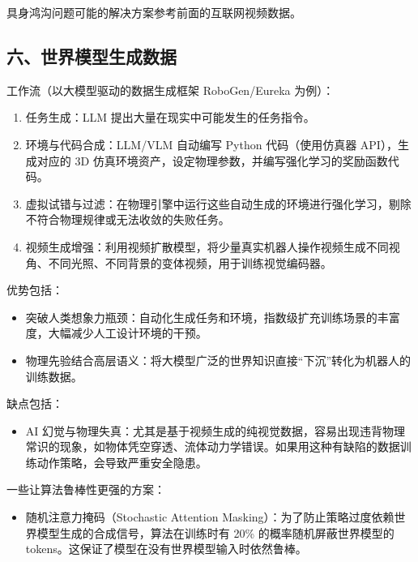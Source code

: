 具身鸿沟问题可能的解决方案参考前面的互联网视频数据。

\hypertarget{ux516dux4e16ux754cux6a21ux578bux751fux6210ux6570ux636e}{%
\subsection{六、世界模型生成数据}\label{ux516dux4e16ux754cux6a21ux578bux751fux6210ux6570ux636e}}

工作流（以大模型驱动的数据生成框架 RoboGen/Eureka 为例）：

\begin{enumerate}
\def\labelenumi{\arabic{enumi}.}
\tightlist
\item
  任务生成：LLM 提出大量在现实中可能发生的任务指令。
\item
  环境与代码合成：LLM/VLM 自动编写 Python 代码（使用仿真器 API），生成对应的 3D 仿真环境资产，设定物理参数，并编写强化学习的奖励函数代码。
\item
  虚拟试错与过滤：在物理引擎中运行这些自动生成的环境进行强化学习，剔除不符合物理规律或无法收敛的失败任务。
\item
  视频生成增强：利用视频扩散模型，将少量真实机器人操作视频生成不同视角、不同光照、不同背景的变体视频，用于训练视觉编码器。
\end{enumerate}

优势包括：

\begin{itemize}
\tightlist
\item
  突破人类想象力瓶颈：自动化生成任务和环境，指数级扩充训练场景的丰富度，大幅减少人工设计环境的干预。
\item
  物理先验结合高层语义：将大模型广泛的世界知识直接``下沉''转化为机器人的训练数据。
\end{itemize}

缺点包括：

\begin{itemize}
\tightlist
\item
  AI 幻觉与物理失真：尤其是基于视频生成的纯视觉数据，容易出现违背物理常识的现象，如物体凭空穿透、流体动力学错误。如果用这种有缺陷的数据训练动作策略，会导致严重安全隐患。
\end{itemize}

一些让算法鲁棒性更强的方案：

\begin{itemize}
\tightlist
\item
  随机注意力掩码（Stochastic Attention Masking）：为了防止策略过度依赖世界模型生成的合成信号，算法在训练时有 20\% 的概率随机屏蔽世界模型的 tokens。这保证了模型在没有世界模型输入时依然鲁棒。
\end{itemize}

